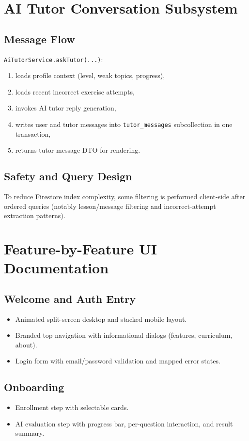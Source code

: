 \documentclass[11pt,a4paper]{article}
\begin{document}
\section{AI Tutor Conversation Subsystem}
\subsection{Message Flow}
\texttt{AiTutorService.askTutor(...)}:
\begin{enumerate}
  \item loads profile context (level, weak topics, progress),
  \item loads recent incorrect exercise attempts,
  \item invokes AI tutor reply generation,
  \item writes user and tutor messages into \texttt{tutor\_messages} subcollection in one transaction,
  \item returns tutor message DTO for rendering.
\end{enumerate}

\subsection{Safety and Query Design}
To reduce Firestore index complexity, some filtering is performed client-side after ordered queries (notably lesson/message filtering and incorrect-attempt extraction patterns).

\section{Feature-by-Feature UI Documentation}
\subsection{Welcome and Auth Entry}
\begin{itemize}
  \item Animated split-screen desktop and stacked mobile layout.
  \item Branded top navigation with informational dialogs (features, curriculum, about).
  \item Login form with email/password validation and mapped error states.
\end{itemize}

\subsection{Onboarding}
\begin{itemize}
  \item Enrollment step with selectable cards.
  \item AI evaluation step with progress bar, per-question interaction, and result summary.
\end{itemize}
\end{document}
